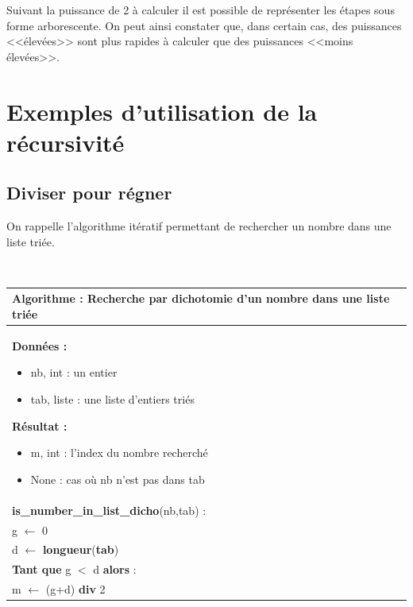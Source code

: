 \documentclass[10pt,fleqn]{article} %
\newcommand{\bfsf}[1]{\small\textbf{\textsf{#1}}}%
\newcommand{\tsf}[1]{\small{\textsf{#1}}}
\begin{document}
Suivant la puissance de 2 à calculer il est possible de représenter les étapes sous forme arborescente. On peut ainsi constater que, dans certain cas, des puissances <<élevées>> sont plus rapides à calculer que des puissances <<moins élevées>>.

\section{Exemples d'utilisation de la récursivité}
\subsection{Diviser pour régner}
On rappelle l'algorithme itératif permettant de rechercher un nombre dans une liste triée. 

\begin{exemple}
~\\
\begin{minipage}[c]{.48\linewidth}
\begin{center}
\begin{tabular}{p{}}
\hline
\textbf{Algorithme :} Recherche par dichotomie d'un nombre dans une liste triée\\
\hline
\textbf{Données :}
\begin{itemize}
\item \tsf{nb}, int : un entier 
\item \tsf{tab}, liste : une liste d'entiers triés
\end{itemize}
\textbf{Résultat :} 
\begin{itemize}
\item \tsf{m}, int : l'index du nombre recherché
\item \tsf{None} : cas où \tsf{nb} n'est pas dans \tsf{tab}
\end{itemize}
\\
\bfsf{is\_number\_in\_list\_dicho}(\tsf{nb},\tsf{tab}) :\\
\hspace{.4cm}\tsf{g} $\leftarrow$ \tsf{0} \\
\hspace{.4cm}\tsf{d} $\leftarrow$ \bfsf{longueur}(\bfsf{tab}) \\
\hspace{.4cm}\bfsf{Tant que} \tsf{g $<$ d} \bfsf{alors} : \\
\hspace{.8cm} \tsf{m} $\leftarrow$ \textsf{(g+d)} \bfsf{div} \textsf{2}\\

\end{tabular}
\end{center}
\end{minipage}
\end{exemple}
\end{document}
